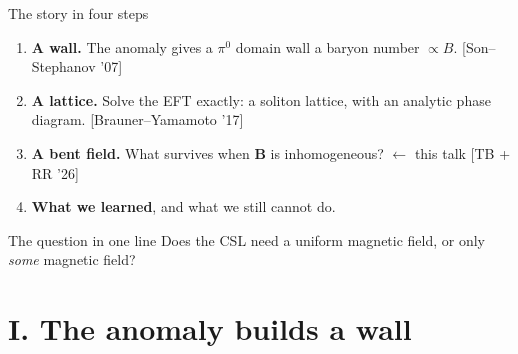 \documentclass[aspectratio=169,10pt]{beamer}
\newcommand{\B}{\bm{B}}
\newcommand{\cit}[1]{{\scriptsize\color{gray}[#1]}}
\begin{document}
\begin{frame}{The story in four steps}
\begin{enumerate}\setlength{\itemsep}{2.2mm}
  \item[\textbf{I}] \textbf{A wall.} The anomaly gives a $\pi^0$ domain wall a
        baryon number $\propto B$. \cit{Son--Stephanov '07}
  \item[\textbf{II}] \textbf{A lattice.} Solve the EFT exactly: a soliton
        lattice, with an analytic phase diagram. \cit{Brauner--Yamamoto '17}
  \item[\textbf{III}] \textbf{A bent field.} What survives when $\B$ is
        inhomogeneous? \alert{$\leftarrow$ this talk} \cit{TB + RR '26}
  \item[\textbf{IV}] \textbf{What we learned}, and what we still cannot do.
\end{enumerate}
\vspace{4mm}
\begin{block}{The question in one line}
Does the CSL need a uniform magnetic field, or only \emph{some} magnetic field?
\end{block}
\end{frame}

\section{I. The anomaly builds a wall}
\end{document}

